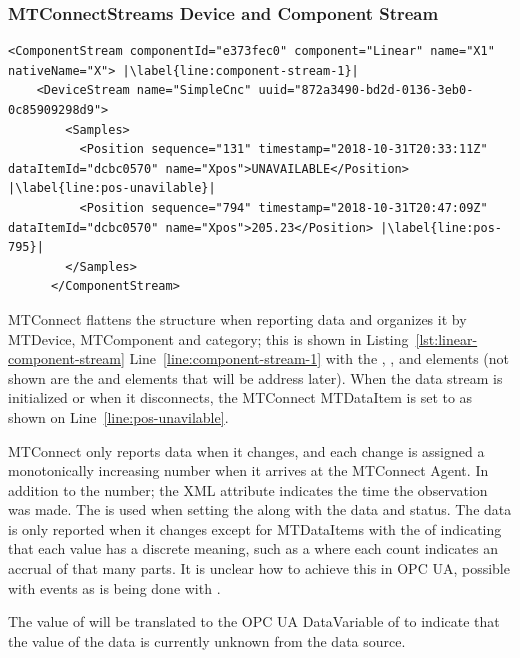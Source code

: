 \subsubsection{MTConnectStreams Device and Component Stream}

\begin{lstlisting}[firstnumber=last,escapechar=|,%
    caption={Component Stream},label={lst:component-stream}]
      <ComponentStream componentId="e373fec0" component="Linear" name="X1" nativeName="X"> |\label{line:component-stream-1}|
    <DeviceStream name="SimpleCnc" uuid="872a3490-bd2d-0136-3eb0-0c85909298d9">    
        <Samples>
          <Position sequence="131" timestamp="2018-10-31T20:33:11Z" dataItemId="dcbc0570" name="Xpos">UNAVAILABLE</Position> |\label{line:pos-unavilable}|
          <Position sequence="794" timestamp="2018-10-31T20:47:09Z" dataItemId="dcbc0570" name="Xpos">205.23</Position> |\label{line:pos-795}|
        </Samples>
      </ComponentStream>
\end{lstlisting}

MTConnect flattens the structure when reporting data and organizes it by \gls{MTDevice}, \gls{MTComponent} and \gls{category}; this is shown in  Listing~\ref{lst:linear-component-stream} Line~\ref{line:component-stream-1} with the , , and  elements (not shown are the  and  elements that will be address later). When the data stream is initialized or when it disconnects, the MTConnect \gls{MTDataItem}  is set to  as shown on Line~\ref{line:pos-unavilable}.

MTConnect only reports data when it changes, and each change is assigned a monotonically increasing  number when it arrives at the MTConnect \gls{Agent}. In addition to the  number; the XML attribute  indicates the time the observation was made. The  is used when setting the   along with the data and status. The data is only reported when it changes except for \glspl{MTDataItem} with the  of  indicating that each value has a discrete meaning, such as a  where each count indicates an accrual of that many parts. {\color{red} It is unclear how to achieve this in OPC UA, possible with events as is being done with }.

The value of  will be translated to the OPC UA \gls{DataVariable}  of  to indicate that the value of the data is currently unknown from the data source. 


